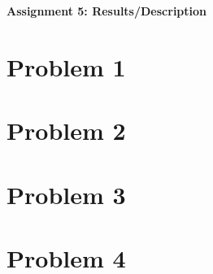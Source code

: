 \documentclass[12pt]{article}
\begin{document}
\begin{center}\begin{LARGE}
\textbf{Assignment 5: Results/Description}
\end{LARGE}\end{center}

\section*{Problem 1}



\section*{Problem 2}



\section*{Problem 3}



\section*{Problem 4}
\end{document}
